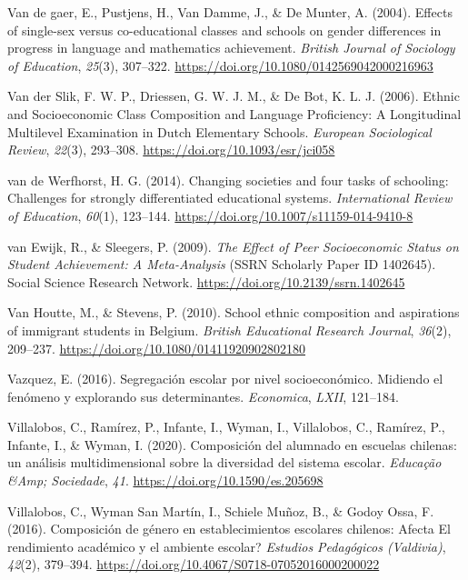 \documentclass[
]{article}
\begin{document}
\leavevmode\hypertarget{ref-vandegaer_effects_2004}{}%
Van de gaer, E., Pustjens, H., Van Damme, J., \& De Munter, A. (2004).
Effects of single-sex versus co-educational classes and schools on
gender differences in progress in language and mathematics achievement.
\emph{British Journal of Sociology of Education}, \emph{25}(3),
307--322. \url{https://doi.org/10.1080/0142569042000216963}

\leavevmode\hypertarget{ref-vanderslik_ethnic_2006}{}%
Van der Slik, F. W. P., Driessen, G. W. J. M., \& De Bot, K. L. J.
(2006). Ethnic and Socioeconomic Class Composition and Language
Proficiency: A Longitudinal Multilevel Examination in Dutch Elementary
Schools. \emph{European Sociological Review}, \emph{22}(3), 293--308.
\url{https://doi.org/10.1093/esr/jci058}

\leavevmode\hypertarget{ref-vandewerfhorst_changing_2014}{}%
van de Werfhorst, H. G. (2014). Changing societies and four tasks of
schooling: Challenges for strongly differentiated educational systems.
\emph{International Review of Education}, \emph{60}(1), 123--144.
\url{https://doi.org/10.1007/s11159-014-9410-8}

\leavevmode\hypertarget{ref-vanewijk_effect_2009}{}%
van Ewijk, R., \& Sleegers, P. (2009). \emph{The Effect of Peer
Socioeconomic Status on Student Achievement: A Meta-Analysis} (SSRN
Scholarly Paper ID 1402645). Social Science Research Network.
\url{https://doi.org/10.2139/ssrn.1402645}

\leavevmode\hypertarget{ref-vanhoutte_school_2010}{}%
Van Houtte, M., \& Stevens, P. (2010). School ethnic composition and
aspirations of immigrant students in Belgium. \emph{British Educational
Research Journal}, \emph{36}(2), 209--237.
\url{https://doi.org/10.1080/01411920902802180}

\leavevmode\hypertarget{ref-vazquez_segregacion_2016}{}%
Vazquez, E. (2016). Segregación escolar por nivel socioeconómico.
Midiendo el fenómeno y explorando sus determinantes. \emph{Economica},
\emph{LXII}, 121--184.

\leavevmode\hypertarget{ref-villalobos_composicion_2020}{}%
Villalobos, C., Ramírez, P., Infante, I., Wyman, I., Villalobos, C.,
Ramírez, P., Infante, I., \& Wyman, I. (2020). Composición del alumnado
en escuelas chilenas: un análisis multidimensional sobre la diversidad
del sistema escolar. \emph{Educação \&Amp; Sociedade}, \emph{41}.
\url{https://doi.org/10.1590/es.205698}

\leavevmode\hypertarget{ref-villalobos_composicion_2016}{}%
Villalobos, C., Wyman San Martín, I., Schiele Muñoz, B., \& Godoy Ossa,
F. (2016). Composición de género en establecimientos escolares chilenos:
Afecta El rendimiento académico y el ambiente escolar? \emph{Estudios
Pedagógicos (Valdivia)}, \emph{42}(2), 379--394.
\url{https://doi.org/10.4067/S0718-07052016000200022}
\end{document}
